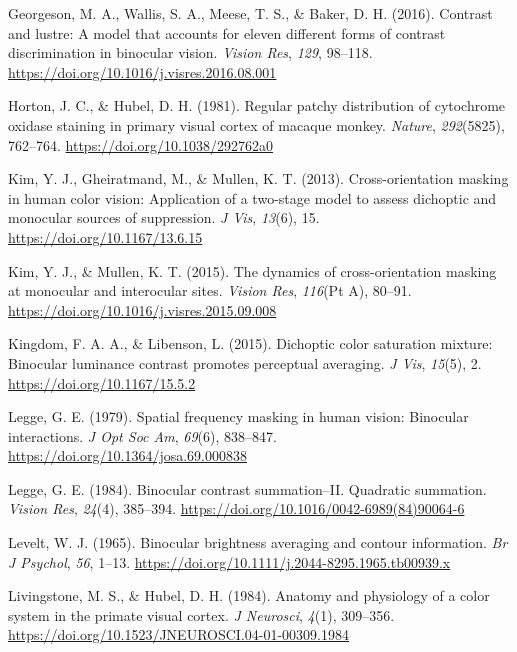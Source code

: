 \documentclass[
  letterpaper,
  DIV=11,
  numbers=noendperiod]{scrartcl}
\newlength{\cslhangindent}
\newlength{\cslentryspacingunit} %
\newenvironment{CSLReferences}[2] %
 {%
  \setlength{\parindent}{0pt}
  \ifodd #1
  \let\oldpar\par
  \def\par{\hangindent=\cslhangindent\oldpar}
  \fi
  \setlength{\parskip}{#2\cslentryspacingunit}
 }%
 {}
\begin{document}
\begin{CSLReferences}{1}{0}
\leavevmode{}%
Georgeson, M. A., Wallis, S. A., Meese, T. S., \& Baker, D. H. (2016).
Contrast and lustre: A model that accounts for eleven different forms of
contrast discrimination in binocular vision. \emph{Vision Res},
\emph{129}, 98--118. \url{https://doi.org/10.1016/j.visres.2016.08.001}

\leavevmode{}%
Horton, J. C., \& Hubel, D. H. (1981). Regular patchy distribution of
cytochrome oxidase staining in primary visual cortex of macaque monkey.
\emph{Nature}, \emph{292}(5825), 762--764.
\url{https://doi.org/10.1038/292762a0}

\leavevmode{}%
Kim, Y. J., Gheiratmand, M., \& Mullen, K. T. (2013). Cross-orientation
masking in human color vision: Application of a two-stage model to
assess dichoptic and monocular sources of suppression. \emph{J Vis},
\emph{13}(6), 15. \url{https://doi.org/10.1167/13.6.15}

\leavevmode{}%
Kim, Y. J., \& Mullen, K. T. (2015). The dynamics of cross-orientation
masking at monocular and interocular sites. \emph{Vision Res},
\emph{116}(Pt A), 80--91.
\url{https://doi.org/10.1016/j.visres.2015.09.008}

\leavevmode{}%
Kingdom, F. A. A., \& Libenson, L. (2015). Dichoptic color saturation
mixture: Binocular luminance contrast promotes perceptual averaging.
\emph{J Vis}, \emph{15}(5), 2. \url{https://doi.org/10.1167/15.5.2}

\leavevmode{}%
Legge, G. E. (1979). Spatial frequency masking in human vision:
Binocular interactions. \emph{J Opt Soc Am}, \emph{69}(6), 838--847.
\url{https://doi.org/10.1364/josa.69.000838}

\leavevmode{}%
Legge, G. E. (1984). Binocular contrast summation--II. Quadratic
summation. \emph{Vision Res}, \emph{24}(4), 385--394.
\url{https://doi.org/10.1016/0042-6989(84)90064-6}

\leavevmode{}%
Levelt, W. J. (1965). Binocular brightness averaging and contour
information. \emph{Br J Psychol}, \emph{56}, 1--13.
\url{https://doi.org/10.1111/j.2044-8295.1965.tb00939.x}

\leavevmode{}%
Livingstone, M. S., \& Hubel, D. H. (1984). Anatomy and physiology of a
color system in the primate visual cortex. \emph{J Neurosci},
\emph{4}(1), 309--356.
\url{https://doi.org/10.1523/JNEUROSCI.04-01-00309.1984}


\end{CSLReferences}
\end{document}
